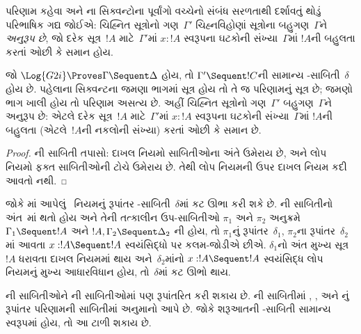 પરિણામ કહેવા
 અને
ના
સિક્વન્ટોના
પૂર્વાંગો વચ્ચેનો
સંબંધ સરળતાથી
દર્શાવતું થોડું
પરિભાષિક ગદ્ય
જોઈએ: ચિહ્નિત
સૂત્રોનો
ગણ~$\Gamma'$
ચિહ્નવિહોણાં
સૂત્રોના
બહુગણ~$\Gamma$ને
\emph{અનુરૂપ છે},
જો દરેક
સૂત્ર~$!A$
માટે~$\Gamma'$માં
$x : !A$
સ્વરૂપના
ઘટકોની
સંખ્યા~$\Gamma$માં
$!A$ની બહુલતા
કરતાં ઓછી કે
સમાન હોય.

\begin{cor}
જો
$\Log{G2i} \Proves \Gamma \Sequent \Delta$
હોય, તો
$\Gamma' \Sequent !C$ની
સામાન્ય
-સાબિતી~$\delta$
હોય છે. પહેલાના
સિક્વન્ટના જમણા
ભાગમાં સૂત્ર
હોય તો તે
જ પરિણામનું
સૂત્ર છે; જમણો
ભાગ ખાલી હોય
તો પરિણામ
અસત્ય છે.
અહીં
ચિહ્નિત
સૂત્રોનો
ગણ~$\Gamma'$
બહુગણ~$\Gamma$ને
અનુરૂપ છે:
એટલે દરેક
સૂત્ર~$!A$
માટે~$\Gamma'$માં
$x : !A$
સ્વરૂપના
ઘટકોની
સંખ્યા~$\Gamma$માં
$!A$ની બહુલતા
(એટલે~$!A$ની
નકલોની સંખ્યા)
કરતાં ઓછી કે
સમાન છે.
\end{cor}

\begin{proof}
ની
સાબિતી તપાસો:
દાખલ નિયમો
સાબિતીઓના
અંતે ઉમેરાય છે,
અને લોપ
નિયમો ફક્ત
સાબિતીઓની
ટોચે ઉમેરાય
છે. તેથી
લોપ
નિયમની ઉપર
દાખલ
નિયમ કદી
આવતો નથી.
\end{proof}

જોકે
માં
આપેલું~\Cut{}
નિયમનું રૂપાંતર
-સાબિતી~$\delta$માં
કટ ઊભા કરી
શકે છે.
ની
સાબિતીનો
અંત~\Cut{}માં
થતો હોય અને
તેની તત્કાલીન
ઉપ-સાબિતીઓ
$\pi_1$ અને
$\pi_2$ અનુક્રમે
$\Gamma_1
\Sequent !A$
અને
$!A, \Gamma_2 \Sequent \Delta_2$
ની હોય, તો
$\pi_1$નું
રૂપાંતર~$\delta_1$,
$\pi_2$ના
રૂપાંતર~$\delta_2$માં
આવતા
$x:!A
\Sequent !A$
સ્વયંસિદ્ધો પર
કલમ-જોડીએ છીએ.
$\delta_1$નો
અંત મુખ્ય
સૂત્ર~$!A$
ધરાવતા
દાખલ
નિયમમાં થાય
અને~$\delta_2$માંનો
$x:!A \Sequent !A$
સ્વયંસિદ્ધ
લોપ
નિયમનું મુખ્ય
આધારવિધાન હોય,
તો~$\delta$માં
કટ ઊભો થાય.

ની
સાબિતીઓને
ની
સાબિતીઓમાં
પણ રૂપાંતરિત
કરી શકાય છે.
ની
સાબિતીમાં
\Elim{\land},
\Elim{\lif},
\Elim{\lnot} અને
\Elim{\lforall}નું
રૂપાંતર પરિણામની
સાબિતીમાં
\Cut{} અનુમાનો
આપે છે.
જોકે શરૂઆતની
-સાબિતી
સામાન્ય સ્વરૂપમાં
હોય, તો આ
ટાળી શકાય છે.

